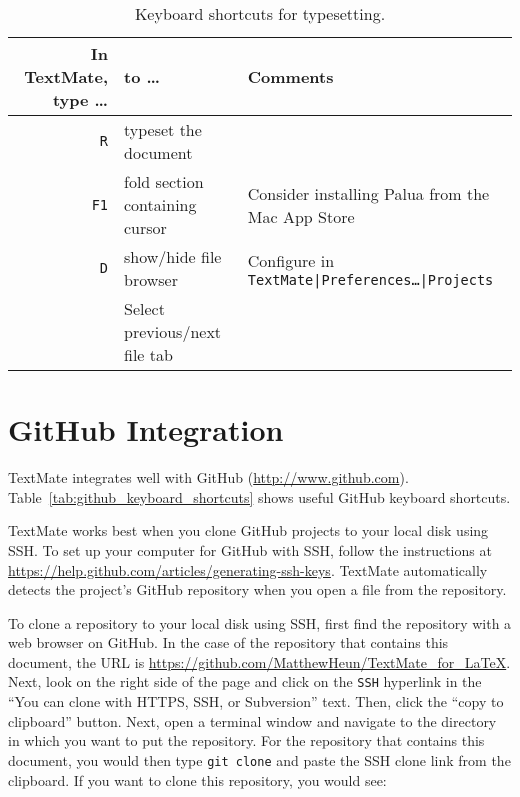 \documentclass[10pt]{article}
\begin{document}
\begin{table}
\centering
\caption{Keyboard shortcuts for typesetting.}
\begin{tabular}{r|l|l}
	In TextMate, type \dots & to \dots      & Comments                  \\
	\hline
	\cmdkey\texttt{R}           & typeset the document            &                           \\
	\texttt{F1}                 & fold section containing cursor  & Consider installing Palua from the Mac App Store \\
	\ctlkey\optkey\cmdkey\texttt{D}&show/hide file browser        & Configure in \texttt{TextMate|Preferences\dots|Projects} \\
	\cmdkey\shiftkey [, \cmdkey\shiftkey ] & Select previous/next file tab  &          \\
	
\end{tabular}
\label{tab:typesetting_keyboard_shortcuts}
\end{table}



\section{GitHub Integration} %
\label{sec:github_integration}

TextMate integrates well with GitHub (\url{http://www.github.com}). 
Table~\ref{tab:github_keyboard_shortcuts} shows useful GitHub keyboard shortcuts.

TextMate works best when you clone GitHub projects to your local disk using SSH. 
To set up your computer for GitHub with SSH, follow the instructions at
\url{https://help.github.com/articles/generating-ssh-keys}. 
TextMate automatically detects the project's GitHub repository 
when you open a file from the repository.

To clone a repository to your local disk using SSH, 
first find the repository with a web browser on GitHub.
In the case of the repository that contains this document, 
the URL is \url{https://github.com/MatthewHeun/TextMate_for_LaTeX}. 
Next, look on the right side of the page and click on 
the \texttt{SSH} hyperlink in the 
``You can clone with HTTPS, SSH, or Subversion'' text.
Then, click the ``copy to clipboard'' button.
Next, open a terminal window and navigate to the directory in which you want to 
put the repository.
For the repository that contains this document, you would then type
\texttt{git clone} and paste the SSH clone link from the clipboard.
If you want to clone this repository, you would see:
\end{document}
